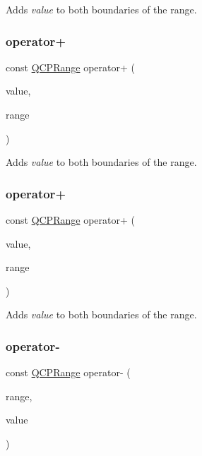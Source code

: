 Adds {\itshape value} to both boundaries of the range. \mbox{\label{class_q_c_p_range_a9fb2e9941d32001482df670c0d704977}} 
\subsubsection{\texorpdfstring{operator+}{operator+}\hspace{0.1cm}{\footnotesize\ttfamily [3/4]}}
{\footnotesize\ttfamily const \hyperlink{class_q_c_p_range}{Q\+C\+P\+Range} operator+ (\begin{DoxyParamCaption}\item[{double}]{value,  }\item[{const \hyperlink{class_q_c_p_range}{Q\+C\+P\+Range} \&}]{range }\end{DoxyParamCaption})\hspace{0.3cm}{\ttfamily [friend]}}

Adds {\itshape value} to both boundaries of the range. \mbox{\label{class_q_c_p_range_a9fb2e9941d32001482df670c0d704977}} 
\subsubsection{\texorpdfstring{operator+}{operator+}\hspace{0.1cm}{\footnotesize\ttfamily [4/4]}}
{\footnotesize\ttfamily const \hyperlink{class_q_c_p_range}{Q\+C\+P\+Range} operator+ (\begin{DoxyParamCaption}\item[{double}]{value,  }\item[{const \hyperlink{class_q_c_p_range}{Q\+C\+P\+Range} \&}]{range }\end{DoxyParamCaption})\hspace{0.3cm}{\ttfamily [friend]}}

Adds {\itshape value} to both boundaries of the range. \mbox{\label{class_q_c_p_range_a797f82830b516646da8873f82e39e356}} 
\subsubsection{\texorpdfstring{operator-\/}{operator-}\hspace{0.1cm}{\footnotesize\ttfamily [1/2]}}
{\footnotesize\ttfamily const \hyperlink{class_q_c_p_range}{Q\+C\+P\+Range} operator-\/ (\begin{DoxyParamCaption}\item[{const \hyperlink{class_q_c_p_range}{Q\+C\+P\+Range} \&}]{range,  }\item[{double}]{value }\end{DoxyParamCaption})\hspace{0.3cm}{\ttfamily [friend]}}

